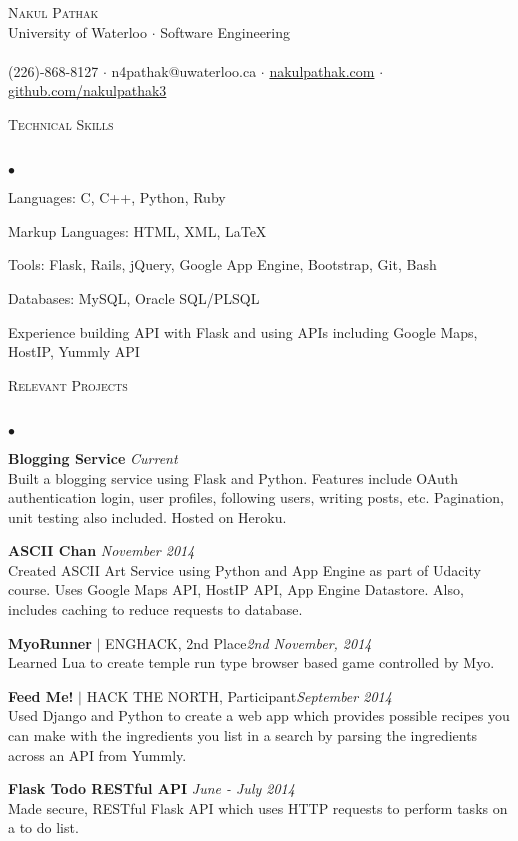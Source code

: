 \documentclass{article}
\newcommand{\lineunder}{\vspace*{-8pt} \\ \hspace*{-18pt} \hrulefill \\}
\newcommand{\header}[1]{{\hspace*{-15pt}\vspace*{6pt} \textsc{#1}} \vspace*{-6pt} \lineunder}
\newenvironment{achievements}{\begin{list}{$\bullet$}{\topsep 0pt \itemsep -1.5pt \leftmargin 5pt}}{\vspace*{4pt}\end{list}}
\begin{document}
\small
\smallskip
\vspace*{-45pt}

\begin{center}
	{\huge \scshape {Nakul Pathak}} \\
\vspace*{3pt} 
University of Waterloo $\cdot$ Software Engineering \\
\vspace{-5pt}
\hrulefill \\
(226)-868-8127 \hfill $\cdot$ n4pathak@uwaterloo.ca \hfill $\cdot$   \url{nakulpathak.com}  \hfill $\cdot$ \url{github.com/nakulpathak3}
\end{center}


\vspace{7pt}
\header{\normalsize Technical Skills}
\begin{achievements}
\item Languages: C, C++, Python, Ruby
\item Markup Languages: HTML, XML, LaTeX
\item Tools: Flask, Rails, jQuery, Google App Engine, Bootstrap, Git, Bash
\item Databases: MySQL, Oracle SQL/PLSQL
\item Experience building API with Flask and using APIs including Google Maps, HostIP, Yummly API
\end{achievements}

\vspace{7pt}

\header{\normalsize Relevant Projects}
\begin{achievements}
\item \textbf{Blogging Service}  \hfill \textit {Current}
\\ Built a blogging service using Flask and Python. Features include OAuth authentication login, user profiles, following users, writing posts, etc. Pagination, unit testing also included. Hosted on Heroku.
\item \textbf{ASCII Chan} \hfill \textit {November 2014}
\\ Created ASCII Art Service using Python and App Engine as part of Udacity course. Uses Google Maps API, HostIP API, App Engine Datastore. Also, includes caching to reduce requests to database. 
\item\textbf{MyoRunner} {$|$ \scriptsize ENGHACK, 2nd Place}\hfill\textit{2nd November, 2014}
\\ Learned Lua to create temple run type browser based game controlled by Myo.
\item \textbf{Feed Me!} {$|$ \scriptsize HACK THE NORTH, Participant}\hfill \textit {September 2014}
\\ Used Django and Python to create a web app which provides possible recipes you can make with the ingredients you list in a search by parsing the ingredients across an API from Yummly.
\item \textbf{Flask Todo RESTful API} \hfill \textit {June - July 2014}
\\ Made secure, RESTful Flask API which uses HTTP requests to perform tasks on a to do list.
\end{achievements}
\end{document}
